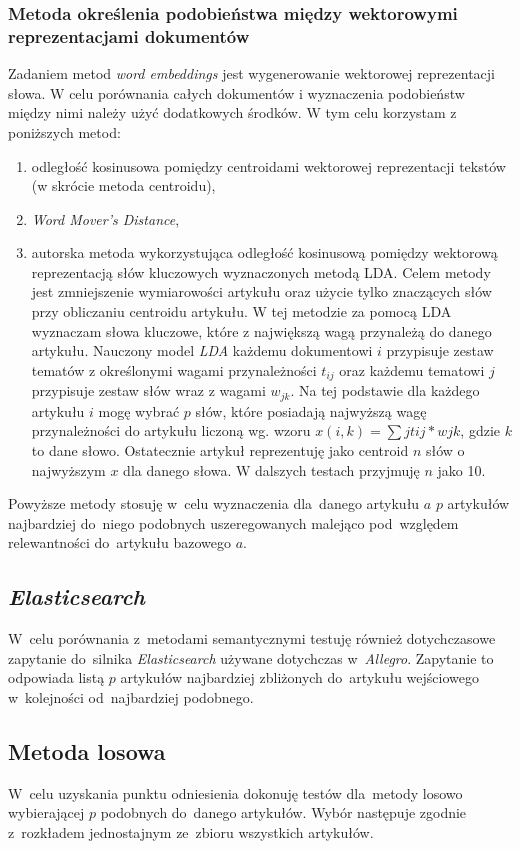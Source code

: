\documentclass[pl]{minipw} %
\begin{document}
\subsubsection{Metoda określenia podobieństwa między wektorowymi reprezentacjami dokumentów}
Zadaniem metod \textit{word embeddings} jest wygenerowanie wektorowej reprezentacji słowa. W celu porównania całych dokumentów i wyznaczenia podobieństw między nimi należy użyć dodatkowych środków. W tym celu korzystam z poniższych metod:
\begin{enumerate}
	\item odległość kosinusowa pomiędzy centroidami wektorowej reprezentacji tekstów (w skrócie metoda centroidu),
	\item \textit{Word Mover's Distance},
	\item autorska metoda wykorzystująca odległość kosinusową pomiędzy wektorową reprezentacją słów kluczowych wyznaczonych metodą LDA. Celem metody jest zmniejszenie wymiarowości artykułu oraz użycie tylko znaczących słów przy obliczaniu centroidu artykułu. W tej metodzie za pomocą LDA wyznaczam słowa kluczowe, które z największą wagą przynależą do danego artykułu. Nauczony model \textit{LDA} każdemu dokumentowi $i$ przypisuje zestaw tematów z określonymi wagami przynależności $t_{ij}$ oraz każdemu tematowi $j$ przypisuje zestaw słów wraz z wagami $w_{jk}$. Na tej podstawie dla każdego artykułu $i$ mogę wybrać $p$ słów, które posiadają najwyższą wagę przynależności do artykułu liczoną wg. wzoru $x(i,k)=\sum{j}t{ij}*w{jk}$, gdzie $k$ to dane słowo. Ostatecznie artykuł reprezentuję jako centroid $n$ słów o najwyższym $x$ dla danego słowa. W dalszych testach przyjmuję $n$ jako 10.
\end{enumerate}

Powyższe metody stosuję w~celu wyznaczenia dla~danego artykułu $a$ $p$ artykułów najbardziej do~niego podobnych uszeregowanych malejąco pod~względem relewantności do~artykułu bazowego $a$.

\subsection{\textit{Elasticsearch}}
W~celu porównania z~metodami semantycznymi testuję również dotychczasowe zapytanie do~silnika \textit{Elasticsearch} używane dotychczas w~\textit{Allegro}. Zapytanie to odpowiada listą $p$ artykułów najbardziej zbliżonych do~artykułu wejściowego w~kolejności od~najbardziej podobnego.

\subsection{Metoda losowa}
W~celu uzyskania punktu odniesienia dokonuję testów dla~metody losowo wybierającej $p$ podobnych do~danego artykułów. Wybór następuje zgodnie z~rozkładem jednostajnym ze~zbioru wszystkich artykułów.
\end{document}
